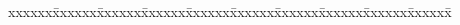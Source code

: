 \documentclass[a4paper,italian]{article}
\newenvironment{bidtable}
{\begin{tabbing}

    xxxxxx\=xxxxxx\=xxxxxx\=xxxxxx\=xxxxxx\=xxxxxx\=xxxxxx\=xxxxxx\=xxxxxx\=xxxxxx\=\kill}
{\end{tabbing} }%
\begin{document}
\begin{multicols}{2}
\begin{bidtable}
                                    \end{bidtable}
                                    

                                    \end{multicols}
                                
\end{document}
